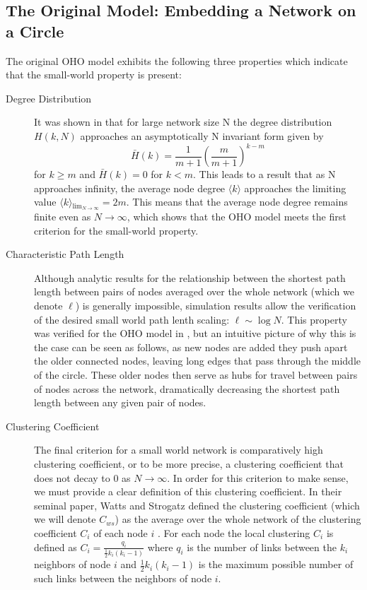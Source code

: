 \documentclass[aps,pre,reprint,superscriptaddress,amsmath,amssymb]{revtex4-1}
\begin{document}
\subsection{The Original Model: Embedding a Network on a Circle}
The original OHO model exhibits the following three properties which indicate that the small-world property is present:
\begin{description}
  \item[Degree Distribution] It was shown in \cite{ozik2004} that for large network size N the degree distribution $H(k,N)$ approaches an asymptotically N invariant form given by 
\[\bar{H}(k) = \frac{1}{m+1}\left(\frac{m}{m+1}\right)^{k-m}\]
for $k \geq m$ and $\bar{H}(k) = 0$ for $k < m$.
This leads to a result that as N approaches infinity, the average node degree $\langle k \rangle$ approaches the limiting value $\langle k \rangle {_\lim_{N \to \infty}} = 2m$.
This means that the average node degree remains finite even as $N \to \infty$, which shows that the OHO model meets the first criterion for the small-world property.
  \item[Characteristic Path Length] Although analytic results for the relationship between the shortest path length between pairs of nodes averaged over the whole network (which we denote $\ell$) is generally impossible, simulation results allow the verification of the desired small world path lenth scaling: $\ell \sim \log N$.
This property was verified for the OHO model in \cite{ozik2004}, but an intuitive picture of why this is the case can be seen as follows, as new nodes are added they push apart the older connected nodes, leaving long edges that pass through the middle of the circle. 
These older nodes then serve as hubs for travel between pairs of nodes across the network, dramatically decreasing the shortest path length between any given pair of nodes.
  \item[Clustering Coefficient] The final criterion for a small world network is comparatively high clustering coefficient, or to be more precise, a clustering coefficient that does not decay to $0$ as $N \to \infty$. 
In order for this criterion to make sense, we must provide a clear definition of this clustering coefficient. 
In their seminal paper, Watts and Strogatz defined the clustering coefficient (which we will denote $C_{ws}$) as the average over the whole network of the clustering coefficient $C_i$ of each node $i$ \cite{wsnat}.
For each node the local clustering $C_i$ is defined as $C_i = \frac{q_i}{\frac{1}{2} k_i(k_i-1)}$ where $q_i$ is the number of links between the $k_i$ neighbors of node $i$ and $\frac{1}{2} k_i(k_i-1)$ is the maximum possible number of such links between the neighbors of node $i$.

\end{description}
\end{document}
